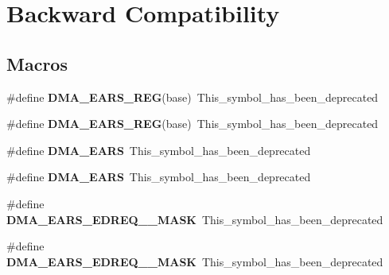 \hypertarget{group__Backward__Compatibility__Symbols}{}\section{Backward Compatibility}
\label{group__Backward__Compatibility__Symbols}
\subsection*{Macros}
\begin{DoxyCompactItemize}
\item 
\#define {\bfseries D\+M\+A\+\_\+\+E\+A\+R\+S\+\_\+\+R\+EG}(base)~This\+\_\+symbol\+\_\+has\+\_\+been\+\_\+deprecated\hypertarget{group__Backward__Compatibility__Symbols_ga66eb3de7d0217ad30b7a12a70320c527}{}\label{group__Backward__Compatibility__Symbols_ga66eb3de7d0217ad30b7a12a70320c527}

\item 
\#define {\bfseries D\+M\+A\+\_\+\+E\+A\+R\+S\+\_\+\+R\+EG}(base)~This\+\_\+symbol\+\_\+has\+\_\+been\+\_\+deprecated\hypertarget{group__Backward__Compatibility__Symbols_ga66eb3de7d0217ad30b7a12a70320c527}{}\label{group__Backward__Compatibility__Symbols_ga66eb3de7d0217ad30b7a12a70320c527}

\item 
\#define {\bfseries D\+M\+A\+\_\+\+E\+A\+RS}~This\+\_\+symbol\+\_\+has\+\_\+been\+\_\+deprecated\hypertarget{group__Backward__Compatibility__Symbols_ga2e868ab7a8a5df4ad496ba6929035154}{}\label{group__Backward__Compatibility__Symbols_ga2e868ab7a8a5df4ad496ba6929035154}

\item 
\#define {\bfseries D\+M\+A\+\_\+\+E\+A\+RS}~This\+\_\+symbol\+\_\+has\+\_\+been\+\_\+deprecated\hypertarget{group__Backward__Compatibility__Symbols_ga2e868ab7a8a5df4ad496ba6929035154}{}\label{group__Backward__Compatibility__Symbols_ga2e868ab7a8a5df4ad496ba6929035154}

\item 
\#define {\bfseries D\+M\+A\+\_\+\+E\+A\+R\+S\+\_\+\+E\+D\+R\+E\+Q\+\_\+\_\+\+M\+A\+SK}~This\+\_\+symbol\+\_\+has\+\_\+been\+\_\+deprecated\hypertarget{group__Backward__Compatibility__Symbols_gab6368234862b48e0a7f2309ace3992f6}{}\label{group__Backward__Compatibility__Symbols_gab6368234862b48e0a7f2309ace3992f6}

\item 
\#define {\bfseries D\+M\+A\+\_\+\+E\+A\+R\+S\+\_\+\+E\+D\+R\+E\+Q\+\_\+\_\+\+M\+A\+SK}~This\+\_\+symbol\+\_\+has\+\_\+been\+\_\+deprecated\hypertarget{group__Backward__Compatibility__Symbols_gab6368234862b48e0a7f2309ace3992f6}{}\label{group__Backward__Compatibility__Symbols_gab6368234862b48e0a7f2309ace3992f6}


\end{DoxyCompactItemize}
